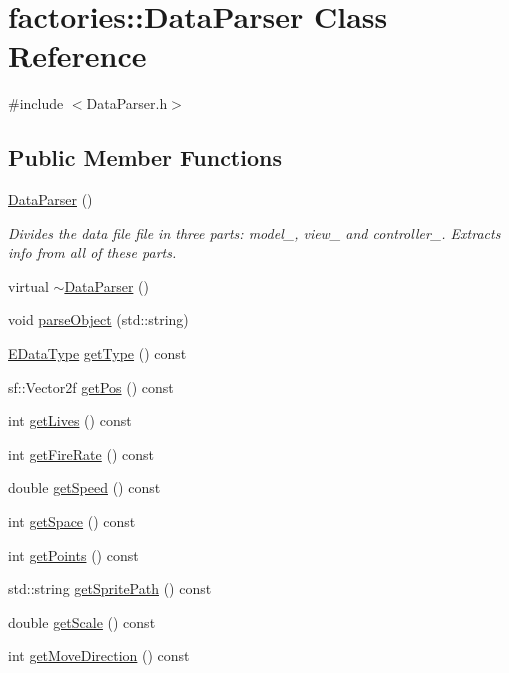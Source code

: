 \hypertarget{classfactories_1_1DataParser}{\section{factories\-:\-:\-Data\-Parser \-Class \-Reference}
\label{d0/df8/classfactories_1_1DataParser}
}


{\ttfamily \#include $<$\-Data\-Parser.\-h$>$}

\subsection*{\-Public \-Member \-Functions}
\begin{DoxyCompactItemize}
\item 
\hyperlink{classfactories_1_1DataParser_aac17dc8db51596aca733fa922e1a63b9}{\-Data\-Parser} ()
\begin{DoxyCompactList}\small\item\em \-Divides the data file file in three parts\-: model\-\_\-, view\-\_\- and controller\-\_\-. \-Extracts info from all of these parts. \end{DoxyCompactList}\item 
virtual \hyperlink{classfactories_1_1DataParser_ada5bd61bf142b53c761b651dbbb300e6}{$\sim$\-Data\-Parser} ()
\item 
void \hyperlink{classfactories_1_1DataParser_ac46afc028909e2879ccc6049396371b5}{parse\-Object} (std\-::string)
\item 
\hyperlink{namespacefactories_ab925b318a5bc89d3bc8a7e3fdc364023}{\-E\-Data\-Type} \hyperlink{classfactories_1_1DataParser_aef51f61d8415bd0ca5645a85a7698412}{get\-Type} () const 
\item 
sf\-::\-Vector2f \hyperlink{classfactories_1_1DataParser_a3e0e635185cfd30d7580da30fd3fae71}{get\-Pos} () const 
\item 
int \hyperlink{classfactories_1_1DataParser_adedcdaf3f1eda6b1d4ed078c11d71b1e}{get\-Lives} () const 
\item 
int \hyperlink{classfactories_1_1DataParser_a55ad897d093a9076f97756adad963081}{get\-Fire\-Rate} () const 
\item 
double \hyperlink{classfactories_1_1DataParser_abdd71ea54b23d6fb94561300d72a1fa2}{get\-Speed} () const 
\item 
int \hyperlink{classfactories_1_1DataParser_a62a533de7d1b80a486c5e99271b3a9d9}{get\-Space} () const 
\item 
int \hyperlink{classfactories_1_1DataParser_afcd3558ab77010523582314345574b37}{get\-Points} () const 
\item 
std\-::string \hyperlink{classfactories_1_1DataParser_af75268ebfca8319cfdf33f1532e20c01}{get\-Sprite\-Path} () const 
\item 
double \hyperlink{classfactories_1_1DataParser_a9c9e6de122e3ccd430c13d2012fb19e2}{get\-Scale} () const 
\item 
int \hyperlink{classfactories_1_1DataParser_a6dacf31e0201c6e4deda4e416bcc1429}{get\-Move\-Direction} () const 
\end{DoxyCompactItemize}
